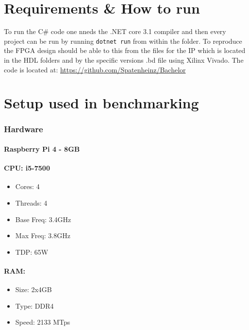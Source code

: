 \documentclass[a4paper, openany]{book}
\begin{document}
\begin{appendix}
\chapter{Requirements \& How to run}
\label{sec:orgb9e7828}
To run the C\# code one nneds the .NET core 3.1 compiler and then every project can be run by running \texttt{dotnet run} from within the folder. To reproduce the FPGA design should be able to this from the files for the IP which is located in the HDL folders and by the specific versions .bd file using Xilinx Vivado. The code is located at: \url{https://github.com/Spatenheinz/Bachelor}
\chapter{Setup used in benchmarking}
\label{sec:org0d9b46c}
\label{benchmarksetup}
\begin{minipage}{0.4\textwidth}
\subsection{Hardware}
\subsubsection{Raspberry Pi 4 - 8GB}

\subsubsection{CPU: i5-7500}
\begin{itemize}
\itemsep0em
\item Cores: 4\\
\item Threads: 4\\
\item Base Freq: 3.4GHz\\
\item Max Freq: 3.8GHz\\
\item TDP: 65W
\end{itemize}
\subsubsection{RAM:}
\begin{itemize}
\itemsep0em
\item Size: 2x4GB\\
\item Type: DDR4\\
\item Speed: 2133 MTps\\
\end{itemize}

\end{minipage}
\end{appendix}
\end{document}
